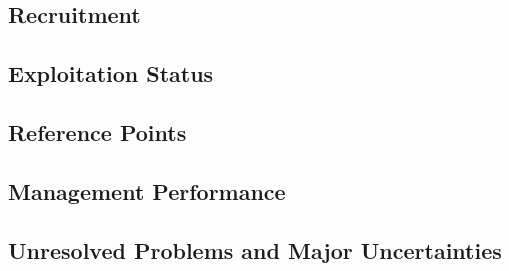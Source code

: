 \documentclass[11pt,
  english,
  a4paper,
]{article}
\begin{document}
\leavevmode\tagmcend\tagstructend


\hypertarget{recruitment}{%
\subsection*{Recruitment}\label{recruitment}}

\leavevmode\tagmcend\tagstructend


\hypertarget{exploitation-status}{%
\subsection*{Exploitation Status}\label{exploitation-status}}

\leavevmode\tagmcend\tagstructend


\hypertarget{reference-points}{%
\subsection*{Reference Points}\label{reference-points}}

\leavevmode\tagmcend\tagstructend


\hypertarget{management-performance}{%
\subsection*{Management Performance}\label{management-performance}}

\leavevmode\tagmcend\tagstructend


\hypertarget{unresolved-problems-and-major-uncertainties}{%
\subsection*{Unresolved Problems and Major Uncertainties}\label{unresolved-problems-and-major-uncertainties}}
\end{document}
